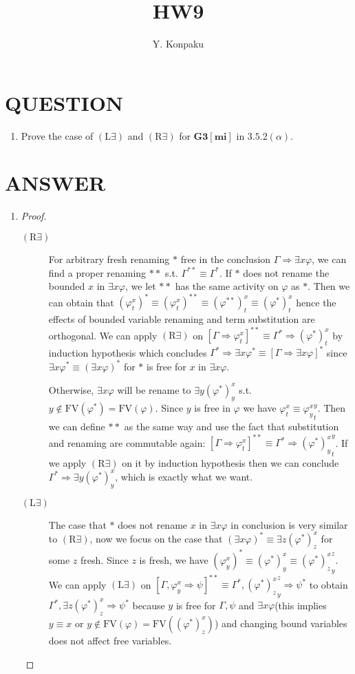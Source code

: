 \documentclass[12pt]{article}
\newcommand\A{\varphi}
\newcommand\B{\psi}
\newcommand\GG\Gamma
\newcommand\TO\Rightarrow
\newcommand\PC[1]{\mathbf{#1}}
\newcommand\FV[1]{\mathrm{FV}({#1})}
\newcommand\LX{\textrm{L$\exists$}}
\newcommand\RX{\textrm{R$\exists$}}
\begin{document}
\title{HW9}
\author{Y. Konpaku}

\maketitle

\section{QUESTION}
\begin{enumerate}
    \item Prove the case of $(\LX)$ and $(\RX)$ for $\PC{G3[mi]}$ in $3.5.2(\alpha)$.
\end{enumerate}

\section{ANSWER}
\begin{enumerate}
    \item \begin{proof}\ 
        \begin{description}
            \item[$(\RX)$] For arbitrary fresh renaming $*$ free in the conclusion $\GG\TO\exists x\A$, we can find a proper renaming $**$ s.t. $\GG^{**}\equiv\GG^*$. If $*$ does not rename the bounded $x$ in $\exists x\A$, we let $**$ has the same activity on $\A$ as $*$. Then we can obtain that $(\A^x_t)^*\equiv(\A^x_t)^{**}\equiv(\A^{**})^x_t\equiv(\A^*)^x_t$ hence the effects of bounded variable renaming and term substitution are orthogonal. We can apply $(\RX)$ on $[\GG\TO\A^x_t]^{**}\equiv\GG^*\TO(\A^*)^x_t$ by induction hypothesis which concludes $\GG^*\TO\exists x\A^*\equiv[\GG\TO\exists x\A]^*$ since $\exists x\A^*\equiv(\exists x\A)^*$ for $*$ is free for $x$ in $\exists x\A$.
            
            Otherwise, $\exists x\A$ will be rename to $\exists y(\A^*)^x_y$ s.t. $y\not\in\FV{\A^*}=\FV{\A}$. Since $y$ is free in $\A$ we have $\A^x_t\equiv{\A^x_y}^y_t$. Then we can define $**$ as the same way and use the fact that substitution and renaming are commutable again: $[\GG\TO\A^x_t]^{**}\equiv\GG^*\TO{(\A^*)^x_y}^y_t$. If we apply $(\RX)$ on it by induction hypothesis then we can conclude $\GG^*\TO\exists y(\A^*)^x_y$, which is exactly what we want.
            \item[$(\LX)$] The case that $*$ does not rename $x$ in $\exists x\A$ in conclusion is very similar to $(\RX)$, now we focus on the case that $(\exists x\A)^*\equiv\exists z(\A^*)^x_z$ for some $z$ fresh. Since $z$ is fresh, we have $(\A^x_y)^*\equiv(\A^*)^x_y\equiv{(\A^*)^x_z}^z_y$. We can apply $(\LX)$ on $[\GG,\A^x_y\TO\B]^{**}\equiv\GG^*,{(\A^*)^x_z}^z_y\TO\B^*$ to obtain $\GG^*,\exists z(\A^*)^x_z\TO\B^*$ because $y$ is free for $\GG,\B$ and $\exists x\A$(this implies $y\equiv x$ or $y\notin\FV{\A}=\FV{(\A^*)^x_z}$) and changing bound variables does not affect free variables.
        \end{description}
    \end{proof}
\end{enumerate}
\end{document}
